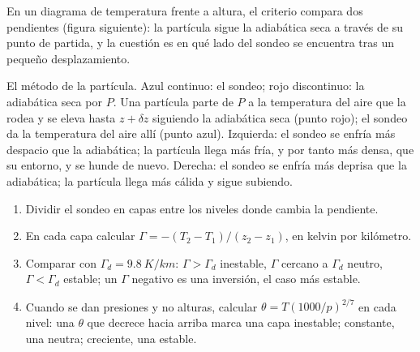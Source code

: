 En un diagrama de temperatura frente a altura, el criterio compara dos pendientes (figura siguiente): la partícula sigue la adiabática seca a través de su punto de partida, y la cuestión es en qué lado del sondeo se encuentra tras un pequeño desplazamiento.

\begin{omfigure}

{\small El método de la partícula. Azul continuo: el sondeo; rojo discontinuo: la adiabática seca por $P$. Una partícula parte de $P$ a la temperatura del aire que la rodea y se eleva hasta $z + \delta z$ siguiendo la adiabática seca (punto rojo); el sondeo da la temperatura del aire allí (punto azul). Izquierda: el sondeo se enfría más despacio que la adiabática; la partícula llega más fría, y por tanto más densa, que su entorno, y se hunde de nuevo. Derecha: el sondeo se enfría más deprisa que la adiabática; la partícula llega más cálida y sigue subiendo.}
\label{fig:b1:fluid-envelopes-structure:parcel}
\end{omfigure}

\begin{method}\label{met:b1:fluid-envelopes-structure:sounding}
\begin{enumerate}
  \item Dividir el sondeo en capas entre los niveles donde cambia la pendiente.
  \item En cada capa calcular $\Gamma = -(T_2 - T_1)/(z_2 - z_1)$, en kelvin por
        kilómetro.
  \item Comparar con $\Gamma_d = \qty{9.8}{K/km}$: $\Gamma > \Gamma_d$ inestable,
        $\Gamma$ cercano a $\Gamma_d$ neutro, $\Gamma < \Gamma_d$ estable; un
        $\Gamma$ negativo es una inversión, el caso más estable.
  \item Cuando se dan presiones y no alturas, calcular $\theta =
        T(1000/p)^{2/7}$ en cada nivel: una $\theta$ que decrece hacia arriba marca
        una capa inestable; constante, una neutra; creciente, una estable.
\end{enumerate}
\end{method}

